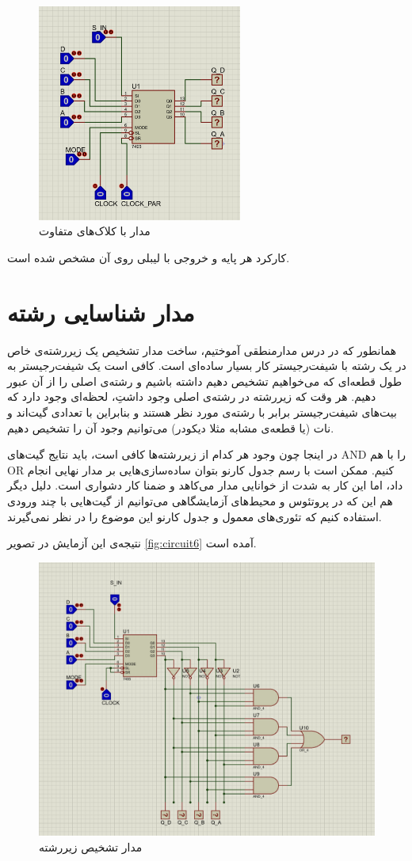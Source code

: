 \begin{figure}[h!]
    \centering
    \includegraphics[width=0.6\textwidth]{part2/8.png}
    \caption{
    مدار با کلاک‌های متفاوت
    }
    \label{fig:circuit7}
\end{figure}

کارکرد هر پایه و خروجی با لیبلی روی آن مشخص شده است.


\section{
مدار شناسایی رشته
}
همانطور که در درس مدارمنطقی آموختیم، ساخت مدار تشخیص یک زیررشته‌ی 
خاص در یک رشته با شیفت‌رجیستر کار بسیار ساده‌ای است.
کافی است یک شیفت‌رجیستر به طول قطعه‌ای که می‌خواهیم تشخیص دهیم داشته باشیم و رشته‌ی اصلی را از آن عبور دهیم.
هر وقت که زیررشته در رشته‌ی اصلی وجود داشتِ، لحظه‌ای وجود دارد که بیت‌های شیفت‌رجیستر برابر با رشته‌ی مورد نظر هستند و بنابراین با تعدادی گیت‌اند و نات
(یا قطعه‌ی مشابه مثلا دیکودر)
می‌توانیم وجود آن را تشخیص دهیم.

در اینجا چون وجود هر کدام از زیررشته‌ها کافی است، باید نتایج
گیت‌های
AND
را با هم
OR
کنیم.
ممکن است با رسم جدول کارنو بتوان ساده‌سازی‌هایی بر مدار نهایی انجام داد، اما این کار به شدت از خوانایی مدار می‌کاهد و ضمنا کار دشواری است.
دلیل دیگر هم این که در پروتئوس و محیط‌های آزمایشگاهی می‌توانیم از گیت‌هایی با چند ورودی استفاده کنیم که تئوری‌های معمول و جدول کارنو این موضوع را در نظر نمی‌گیرند.

نتیجه‌ی این آزمایش در تصویر
\eqref{fig:circuit6}
آمده است.


\begin{figure}[h!]
    \centering
    \includegraphics[width=\textwidth]{part2/9.png}
    \caption{
    مدار تشخیص زیررشته
    }
    \label{fig:circuit6}
\end{figure}
